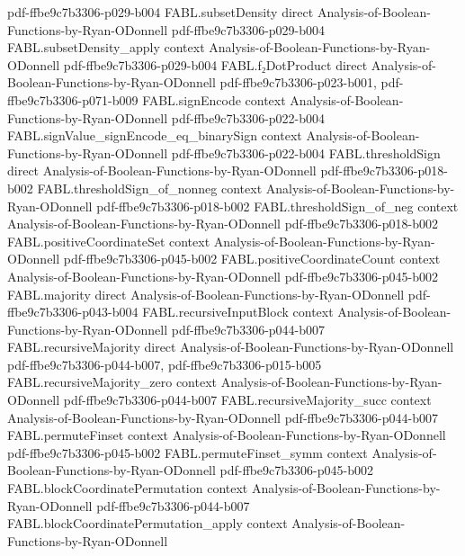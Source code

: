 \begin{theorem}
  {pdf-ffbe9c7b3306-p029-b004}
\proofstep
  {FABL.subsetDensity}
  {direct}
  {Analysis-of-Boolean-Functions-by-Ryan-ODonnell}
  {pdf-ffbe9c7b3306-p029-b004}
\proofstep
  {FABL.subsetDensity_apply}
  {context}
  {Analysis-of-Boolean-Functions-by-Ryan-ODonnell}
  {pdf-ffbe9c7b3306-p029-b004}
\proofstep
  {FABL.f₂DotProduct}
  {direct}
  {Analysis-of-Boolean-Functions-by-Ryan-ODonnell}
  {pdf-ffbe9c7b3306-p023-b001,
    pdf-ffbe9c7b3306-p071-b009}
\proofstep
  {FABL.signEncode}
  {context}
  {Analysis-of-Boolean-Functions-by-Ryan-ODonnell}
  {pdf-ffbe9c7b3306-p022-b004}
\proofstep
  {FABL.signValue_signEncode_eq_binarySign}
  {context}
  {Analysis-of-Boolean-Functions-by-Ryan-ODonnell}
  {pdf-ffbe9c7b3306-p022-b004}
\proofstep
  {FABL.thresholdSign}
  {direct}
  {Analysis-of-Boolean-Functions-by-Ryan-ODonnell}
  {pdf-ffbe9c7b3306-p018-b002}
\proofstep
  {FABL.thresholdSign_of_nonneg}
  {context}
  {Analysis-of-Boolean-Functions-by-Ryan-ODonnell}
  {pdf-ffbe9c7b3306-p018-b002}
\proofstep
  {FABL.thresholdSign_of_neg}
  {context}
  {Analysis-of-Boolean-Functions-by-Ryan-ODonnell}
  {pdf-ffbe9c7b3306-p018-b002}
\proofstep
  {FABL.positiveCoordinateSet}
  {context}
  {Analysis-of-Boolean-Functions-by-Ryan-ODonnell}
  {pdf-ffbe9c7b3306-p045-b002}
\proofstep
  {FABL.positiveCoordinateCount}
  {context}
  {Analysis-of-Boolean-Functions-by-Ryan-ODonnell}
  {pdf-ffbe9c7b3306-p045-b002}
\proofstep
  {FABL.majority}
  {direct}
  {Analysis-of-Boolean-Functions-by-Ryan-ODonnell}
  {pdf-ffbe9c7b3306-p043-b004}
\proofstep
  {FABL.recursiveInputBlock}
  {context}
  {Analysis-of-Boolean-Functions-by-Ryan-ODonnell}
  {pdf-ffbe9c7b3306-p044-b007}
\proofstep
  {FABL.recursiveMajority}
  {direct}
  {Analysis-of-Boolean-Functions-by-Ryan-ODonnell}
  {pdf-ffbe9c7b3306-p044-b007,
    pdf-ffbe9c7b3306-p015-b005}
\proofstep
  {FABL.recursiveMajority_zero}
  {context}
  {Analysis-of-Boolean-Functions-by-Ryan-ODonnell}
  {pdf-ffbe9c7b3306-p044-b007}
\proofstep
  {FABL.recursiveMajority_succ}
  {context}
  {Analysis-of-Boolean-Functions-by-Ryan-ODonnell}
  {pdf-ffbe9c7b3306-p044-b007}
\proofstep
  {FABL.permuteFinset}
  {context}
  {Analysis-of-Boolean-Functions-by-Ryan-ODonnell}
  {pdf-ffbe9c7b3306-p045-b002}
\proofstep
  {FABL.permuteFinset_symm}
  {context}
  {Analysis-of-Boolean-Functions-by-Ryan-ODonnell}
  {pdf-ffbe9c7b3306-p045-b002}
\proofstep
  {FABL.blockCoordinatePermutation}
  {context}
  {Analysis-of-Boolean-Functions-by-Ryan-ODonnell}
  {pdf-ffbe9c7b3306-p044-b007}
\proofstep
  {FABL.blockCoordinatePermutation_apply}
  {context}
  {Analysis-of-Boolean-Functions-by-Ryan-ODonnell}

\end{theorem}
